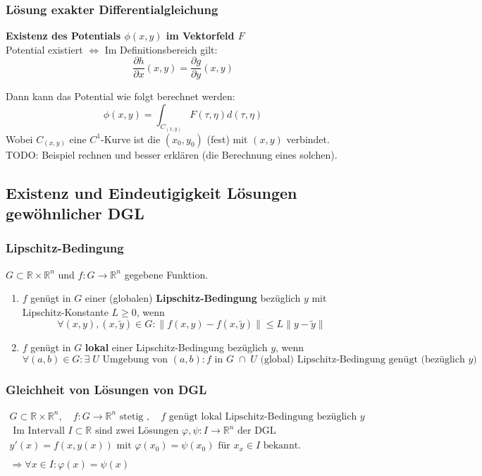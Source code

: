 \documentclass[a4paper]{article}
\newcommand{\R}{\mathbb{R}}
\begin{document}
\subsubsection{Lösung exakter Differentialgleichung}
\textbf{Existenz des Potentials $\phi (x,y)$ im Vektorfeld $F$} 
\\

Potential existiert $\Leftrightarrow$
Im Definitionsbereich gilt:
\[
	\frac{ \partial h }{ \partial x } (x, y) =
	\frac{ \partial g }{ \partial y } (x, y)
\] 

Dann kann das Potential wie folgt berechnet werden:
\[
	\phi (x, y) = \int_{C_{(x,y)}} F(\tau, \eta) d(\tau, \eta)
\] 
Wobei $C_{(x,y)}$ eine $C^{1}$-Kurve ist die $(x_0, y_0)$ (fest) mit
$(x, y)$ verbindet.
\\

TODO: Beispiel rechnen und besser erklären (die Berechnung eines solchen).

\subsection{Existenz und Eindeutigigkeit Lösungen gewöhnlicher DGL}

\subsubsection{Lipschitz-Bedingung}
$G\subset \R \times \R ^{n}$ und $f: G \rightarrow \R ^{n}$
gegebene Funktion.

\begin{enumerate}
	\item $f$ genügt in $G$ einer (globalen) \textbf{Lipschitz-Bedingung} 
		bezüglich $y$ mit Lipschitz-Konstante $L \geq 0$, wenn
		\[
			\forall (x, y), (x, \tilde{y}) \in G:
			\| f(x, y) - f(x, \tilde{y}) \| \leq L \| y - \tilde{y} \|
		\] 
	\item $f$ genügt in $G$ \textbf{lokal} einer Lipschitz-Bedingung bezüglich
		$y$, wenn
		\[
			\forall (a, b) \in G: \exists \; U \text{ Umgebung von } (a, b):
			f \text{ in } G \; \cap \; U 
			\text{ (global) Lipschitz-Bedingung genügt (bezüglich $y$) }
		\] 
\end{enumerate}

\subsubsection{Gleichheit von Lösungen von DGL}
\begin{gather*}
	G\subset \R \times \R ^{n}, \quad
	f: G \rightarrow \R ^{n} \text{ stetig }, \quad
	f \text{ genügt lokal Lipschitz-Bedingung bezüglich } y \\
	\text{ Im Intervall } I \subset \R
	\text{ sind zwei Lösungen } \varphi, \psi: I \rightarrow \R ^{n}
	\text{ der DGL } \\
	y' (x) = f(x, y(x)) \text{ mit }
	\varphi (x_0) = \psi (x_0) \text{ für } x_x \in I
	\text{ bekannt. } \\
	\\
	\Rightarrow \forall x \in I: \varphi (x) = \psi(x) 
\end{gather*}
\end{document}
